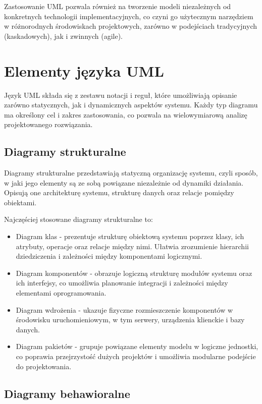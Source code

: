 \documentclass[12pt,a4paper]{article}
\begin{document}
Zastosowanie UML pozwala również na tworzenie modeli niezależnych od konkretnych technologii implementacyjnych, co czyni go użytecznym narzędziem w różnorodnych środowiskach projektowych, zarówno w podejściach tradycyjnych (kaskadowych), jak i zwinnych (agile).

\section{Elementy języka UML}

Język UML składa się z zestawu notacji i reguł, które umożliwiają opisanie zarówno statycznych, jak i dynamicznych aspektów systemu. Każdy typ diagramu ma określony cel i zakres zastosowania, co pozwala na wielowymiarową analizę projektowanego rozwiązania.

\subsection{Diagramy strukturalne}

Diagramy strukturalne przedstawiają statyczną organizację systemu, czyli sposób, w jaki jego elementy są ze sobą powiązane niezależnie od dynamiki działania. Opisują one architekturę systemu, strukturę danych oraz relacje pomiędzy obiektami.

Najczęściej stosowane diagramy strukturalne to:
\begin{itemize}
\item Diagram klas - prezentuje strukturę obiektową systemu poprzez klasy, ich atrybuty, operacje oraz relacje między nimi. Ułatwia zrozumienie hierarchii dziedziczenia i zależności między komponentami logicznymi.
\item Diagram komponentów - obrazuje logiczną strukturę modułów systemu oraz ich interfejsy, co umożliwia planowanie integracji i zależności między elementami oprogramowania.
\item Diagram wdrożenia - ukazuje fizyczne rozmieszczenie komponentów w środowisku uruchomieniowym, w tym serwery, urządzenia klienckie i bazy danych.
\item Diagram pakietów - grupuje powiązane elementy modelu w logiczne jednostki, co poprawia przejrzystość dużych projektów i umożliwia modularne podejście do projektowania.
\end{itemize}

\subsection{Diagramy behawioralne}
\end{document}
